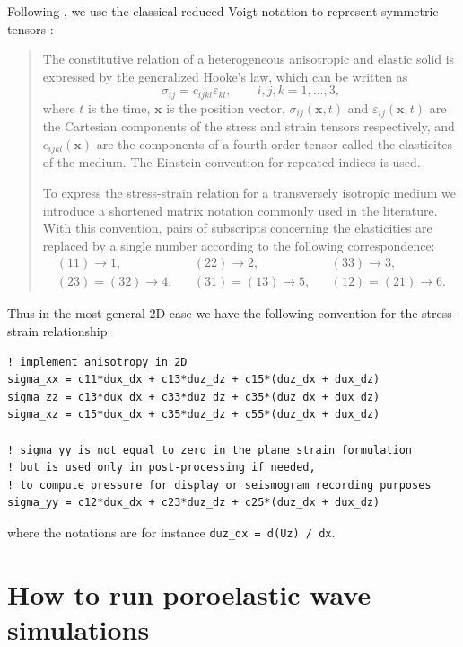 \documentclass[oneside,english,onecolumn,letterpaper]{book}
\begin{document}
Following \cite{CaKoKo88}, we use the classical reduced Voigt notation to represent symmetric
tensors \citep{Hel94,Car07}:
%
\begin{quotation}
The constitutive relation of a heterogeneous anisotropic and elastic solid
is expressed by the generalized Hooke's law, which can be written as
%
\begin{equation*}
\sigma_{ij} = c_{ijkl} \varepsilon_{kl}, \qquad i, j, k = 1, \dots, 3,
\end{equation*}
%
where $t$ is the time, $\mathbf{x}$ is the position vector, $\sigma_{ij}(\mathbf{x}, t)$ and $\varepsilon_{ij}(\mathbf{x}, t)$ are the
Cartesian components of the stress and strain tensors respectively, and
$c_{ijkl}(\mathbf{x})$ are the components of a fourth-order tensor called the elasticites of
the medium. The Einstein convention for repeated indices is used.

To express the stress-strain relation for a transversely isotropic medium
we introduce a shortened matrix notation commonly used in the literature.
With this convention, pairs of subscripts concerning the elasticities are
replaced by a single number according to the following correspondence:
%
\begin{align*}
(11) \rightarrow 1, &&
(22) \rightarrow 2, &&
(33) \rightarrow 3, \\
(23) = (32) \rightarrow 4, &&
(31) = (13) \rightarrow 5, &&
(12) = (21) \rightarrow 6.
\end{align*}
\end{quotation}
%
Thus in the most general 2D case we have the following convention for the stress-strain relationship:
%
\begin{verbatim}
! implement anisotropy in 2D
sigma_xx = c11*dux_dx + c13*duz_dz + c15*(duz_dx + dux_dz)
sigma_zz = c13*dux_dx + c33*duz_dz + c35*(duz_dx + dux_dz)
sigma_xz = c15*dux_dx + c35*duz_dz + c55*(duz_dx + dux_dz)

! sigma_yy is not equal to zero in the plane strain formulation
! but is used only in post-processing if needed,
! to compute pressure for display or seismogram recording purposes
sigma_yy = c12*dux_dx + c23*duz_dz + c25*(duz_dx + dux_dz)
\end{verbatim}
%
where the notations are for instance \texttt{duz\_dx = d(Uz) / dx}.


\section{How to run poroelastic wave simulations}
\end{document}
